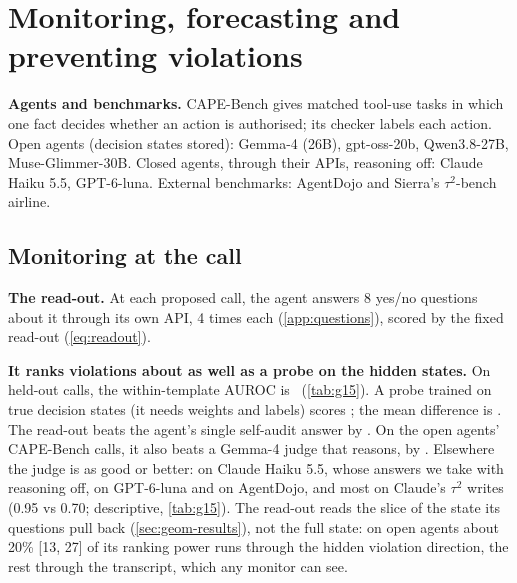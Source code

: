 \section{Monitoring, forecasting and preventing violations}
\label{sec:results}
\textbf{Agents and benchmarks.} CAPE-Bench \citep{fayyazi2026cape} gives matched tool-use tasks in which one fact decides whether an action is authorised; its checker labels each action. Open agents (decision states stored): Gemma-4 (26B), gpt-oss-20b, Qwen3.8-27B, Muse-Glimmer-30B. Closed agents, through their APIs, reasoning off: Claude Haiku 5.5, GPT-6-luna. External benchmarks: AgentDojo and Sierra's $\tau^2$-bench airline.

\subsection{Monitoring at the call}
\label{sec:monitor}
\textbf{The read-out.} At each proposed call, the agent answers 8 yes/no questions about it through its own API, 4 times each (\cref{app:questions}), scored by the fixed read-out (\cref{eq:readout}).

\textbf{It ranks violations about as well as a probe on the hidden states.} On held-out calls, the within-template AUROC is \GFtFixed\ (\cref{tab:g15}). A probe trained on true decision states (it needs weights and labels) scores \GFtTrainedWB; the mean difference is \GFtTtwo. The read-out beats the agent's single self-audit answer by \GFtTone. On the open agents' CAPE-Bench calls, it also beats a Gemma-4 judge that reasons, by \GTwJone. Elsewhere the judge is as good or better: on Claude Haiku 5.5, whose answers we take with reasoning off, on GPT-6-luna and on AgentDojo, and most on Claude's $\tau^2$ writes (0.95 vs 0.70; descriptive, \cref{tab:g15}). The read-out reads the slice of the state its questions pull back (\cref{sec:geom-results}), not the full state: on open agents about 20\% [13, 27] of its ranking power runs through the hidden violation direction, the rest through the transcript, which any monitor can see.

